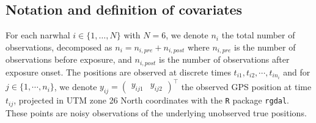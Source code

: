 \documentclass[aoas]{imsart}
\theoremstyle{definition}
\theoremstyle{remark}
\theoremstyle{remark}
\newcommand {\1}{\mathbb{1}}
\begin{document}
\subsection{Notation and definition of covariates}
\label{subsection: covariates}

For each narwhal $i \in \{1,\ldots,N\}$ with $N=6$, we denote $n_i$ the total number of observations,   decomposed as $n_i=n_{i,pre}+n_{i,post}$ where $n_{i,pre}$ is the number of observations before exposure, and $n_{i,post}$ is the number of observations after exposure onset. The positions are observed at discrete times $t_{i1}, t_{i2}, \cdots,t_{in_i}$ and  for $j \in \{1,\cdots,n_i\}$, we denote $y_{ij}=\begin{pmatrix} y_{ij1} & y_{ij2} \end{pmatrix}^\top$ the observed GPS position at time $t_{ij}$, projected in UTM zone 26 North coordinates with the \texttt{R} package \texttt{rgdal}. These points are noisy observations of the underlying unobserved true positions.\\
\end{document}
